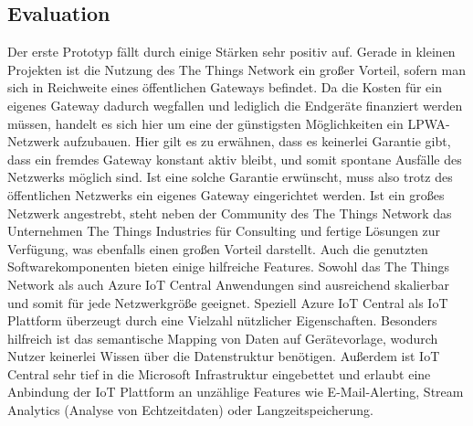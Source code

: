 \subsection{Evaluation}
\label{sec:Prot:procontra1}

Der erste Prototyp fällt durch einige Stärken sehr positiv auf. Gerade in kleinen Projekten ist die Nutzung des The Things Network ein großer Vorteil, sofern man sich in Reichweite eines öffentlichen Gateways befindet. Da die Kosten für ein eigenes Gateway dadurch wegfallen und lediglich die Endgeräte finanziert werden müssen, handelt es sich hier um eine der günstigsten Möglichkeiten ein LPWA-Netzwerk aufzubauen. Hier gilt es zu erwähnen, dass es keinerlei Garantie gibt, dass ein fremdes Gateway konstant aktiv bleibt, und somit spontane Ausfälle des Netzwerks möglich sind. Ist eine solche Garantie erwünscht, muss also trotz des öffentlichen Netzwerks ein eigenes Gateway eingerichtet werden. Ist ein großes Netzwerk angestrebt, steht neben der Community des The Things Network das Unternehmen The Things Industries für Consulting und fertige Lösungen zur Verfügung, was ebenfalls einen großen Vorteil darstellt. Auch die genutzten Softwarekomponenten bieten einige hilfreiche Features. Sowohl das The Things Network als auch Azure IoT Central Anwendungen sind ausreichend skalierbar und somit für jede Netzwerkgröße geeignet. Speziell Azure IoT Central als IoT Plattform überzeugt durch eine Vielzahl nützlicher Eigenschaften. Besonders hilfreich ist das semantische Mapping von Daten auf Gerätevorlage, wodurch Nutzer keinerlei Wissen über die Datenstruktur benötigen. Außerdem ist IoT Central sehr tief in die Microsoft Infrastruktur eingebettet und erlaubt eine Anbindung der IoT Plattform an unzählige Features wie E-Mail-Alerting, Stream Analytics (Analyse von Echtzeitdaten) oder Langzeitspeicherung. 

